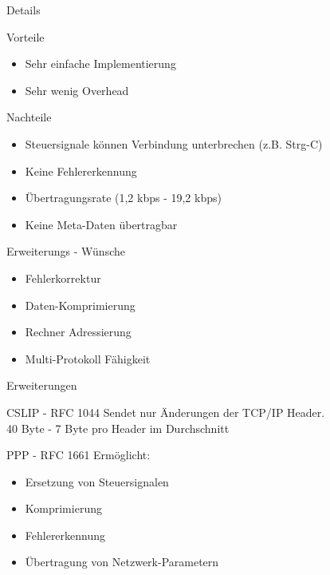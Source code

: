 \documentclass[beamer]{uibk}
\begin{document}
\begin{frame}{Details}
  \newpage
  \begin{center}
    
  \end{center}
\end{frame}

\begin{frame}{}
    \begin{block}{Vorteile}
      \begin{itemize}
        \item Sehr einfache Implementierung
        \item Sehr wenig Overhead
      \end{itemize}
    \end{block}

    \begin{alertblock}{Nachteile}
      \begin{itemize}
        \item Steuersignale können Verbindung unterbrechen (z.B. Strg-C)
        \item Keine Fehlererkennung
        \item Übertragungsrate (1,2 kbps - 19,2 kbps)
        \item Keine Meta-Daten übertragbar
      \end{itemize}
    \end{alertblock}

\end{frame}

\begin{frame}{Erweiterungs - Wünsche}
  \begin{itemize}
    \item Fehlerkorrektur
    \item Daten-Komprimierung
    \item Rechner Adressierung
    \item Multi-Protokoll Fähigkeit
  \end{itemize}
\end{frame}

\begin{frame}{Erweiterungen}
  \begin{block}{CSLIP - RFC 1044}
    Sendet nur Änderungen der TCP/IP Header. \\
    40 Byte - 7 Byte pro Header im Durchschnitt
  \end{block}
  \begin{block}{PPP - RFC 1661}
    Ermöglicht:
    \begin{itemize}
      \item Ersetzung von Steuersignalen
      \item Komprimierung
      \item Fehlererkennung
      \item Übertragung von Netzwerk-Parametern
    \end{itemize}
  \end{block}
\end{frame}
\end{document}
